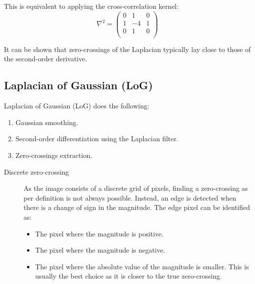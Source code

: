 \begin{description}
        This is equivalent to applying the cross-correlation kernel:
        \[
            \nabla^2 = \begin{pmatrix}
                0 & 1 & 0 \\
                1 & -4 & 1 \\
                0 & 1 & 0 \\
            \end{pmatrix}    
        \]

        \begin{remark}
            It can be shown that zero-crossings of the Laplacian typically lay close to those of the second-order derivative.
        \end{remark}
\end{description}


\subsection{Laplacian of Gaussian (LoG)}

Laplacian of Gaussian (LoG) does the following: 
\begin{enumerate}
    \item Gaussian smoothing.
    \item Second-order differentiation using the Laplacian filter.
    \item Zero-crossings extraction.
\end{enumerate}

\begin{description}
    \item[Discrete zero-crossing]
        As the image consists of a discrete grid of pixels, finding a zero-crossing as per definition is not always possible.
        Instead, an edge is detected when there is a change of sign in the magnitude.
        The edge pixel can be identified as:
        \begin{itemize}
            \item The pixel where the magnitude is positive.
            \item The pixel where the magnitude is negative.
            \item The pixel where the absolute value of the magnitude is smaller. 
                This is usually the best choice as it is closer to the true zero-crossing.
        \end{itemize}
\end{description}

